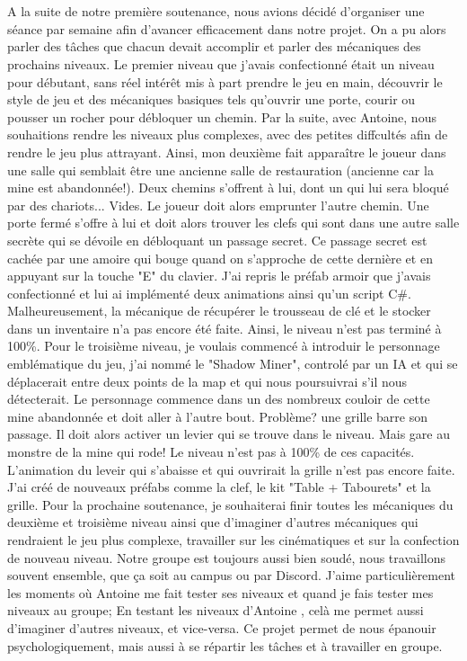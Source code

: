 \documentclass[titlepage, 13px, a4paper]{report}
\begin{document}
\paragraph{} \hspace{0pt} \\
A la suite de notre première soutenance, nous avions décidé d'organiser une séance par semaine afin d'avancer efficacement dans notre projet.
 On a pu alors parler des tâches que chacun devait accomplir et parler des mécaniques des prochains niveaux. Le premier niveau que j'avais 
 confectionné était un niveau pour débutant, sans réel intérêt mis à part prendre le jeu en main, découvrir le style de jeu et des mécaniques 
 basiques tels qu'ouvrir une porte, courir ou pousser un rocher pour débloquer un chemin. Par la suite, avec Antoine, nous souhaitions 
 rendre les niveaux plus complexes, avec des petites diffcultés afin de rendre le jeu plus attrayant. Ainsi, mon deuxième fait 
 apparaître le joueur dans une salle qui semblait être une ancienne salle de restauration (ancienne car la mine est abandonnée!). 
 Deux chemins s'offrent à lui, dont un qui lui sera bloqué par des chariots... Vides. Le joueur doit alors emprunter l'autre chemin. 
 Une porte fermé s'offre à lui et doit alors trouver les clefs qui sont dans une autre salle secrète qui se dévoile en débloquant un 
 passage secret. Ce passage secret est cachée par une amoire qui bouge quand on s'approche de cette dernière et en appuyant sur la 
 touche "E" du clavier. J'ai repris le préfab armoir que j'avais confectionné et lui ai implémenté deux animations ainsi qu'un script C\#. 
 Malheureusement, la mécanique de récupérer le trousseau de clé et le stocker dans un inventaire n'a pas encore été faite. 
 Ainsi, le niveau n'est pas terminé à 100\%. 
Pour le troisième niveau, je voulais commencé à introduir le personnage emblématique du jeu, j'ai nommé le "Shadow Miner",
controlé par un IA et qui se déplacerait entre deux points  de la map et qui nous poursuivrai s'il nous détecterait. 
Le personnage commence dans un des nombreux couloir de cette mine abandonnée et doit aller à l'autre bout. 
Problème? une grille barre son passage. Il doit alors activer un levier qui se trouve dans le niveau. 
Mais gare au monstre de la mine qui rode! 
Le niveau n'est pas à 100\% de ces capacités. L'animation du leveir qui s'abaisse et qui ouvrirait la grille n'est pas encore faite. 
J'ai créé de nouveaux préfabs comme la clef, le kit "Table + Tabourets" et la grille. Pour la prochaine soutenance, 
je souhaiterai finir toutes les mécaniques du deuxième et troisième niveau ainsi que d'imaginer d'autres mécaniques qui rendraient
 le jeu plus complexe, travailler sur les cinématiques et sur la confection de nouveau niveau. 
Notre groupe est toujours aussi bien soudé, nous travaillons souvent ensemble, que ça soit au campus ou par Discord. 
J'aime particulièrement les moments où Antoine me fait tester ses niveaux et quand je fais tester mes niveaux au groupe; 
En testant les niveaux d'Antoine , celà me permet aussi d'imaginer d'autres niveaux, et vice-versa. 
Ce projet permet de nous épanouir psychologiquement, mais aussi à se répartir les tâches et à travailler en groupe.
\end{document}
